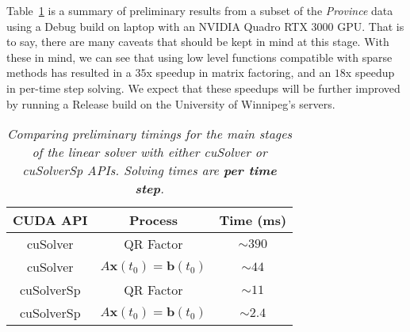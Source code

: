 \documentclass[11pt,letterpaper]{article}
\begin{document}
Table~\ref{t: timings} is a summary of preliminary results from a subset of the \emph{Province} data using a Debug build on laptop with an NVIDIA Quadro RTX 3000 GPU. That is to say, there are many caveats that should be kept in mind at this stage. With these in mind, we can see that using low level functions compatible with sparse methods has resulted in a $35$x speedup in matrix factoring, and an $18$x speedup in per-time step solving. We expect that these speedups will be further improved by running a Release build on the University of Winnipeg's servers.

\begin{table}[b]
  \centering
  \begin{tabular}{| c | c | c |}
    \hline
    {\bf CUDA API} & {\bf Process} & {\bf Time (ms)} \\ \hline
    cuSolver & QR Factor & $\sim 390$ \\ \hline
    cuSolver & $A{\mathbf x}(t_0) = {\mathbf b}(t_0)$ & $\sim 44$ \\ \hline
    cuSolverSp & QR Factor & $\sim 11$ \\ \hline
    cuSolverSp & $A{\mathbf x}(t_0) = {\mathbf b}(t_0)$ & $\sim 2.4$ \\ \hline
  \end{tabular}
  \caption{{\it Comparing preliminary timings for the main stages of the linear solver with either cuSolver or cuSolverSp APIs. Solving times are {\bf per time step}.}}
  \label{t: timings}
\end{table}
\end{document}
